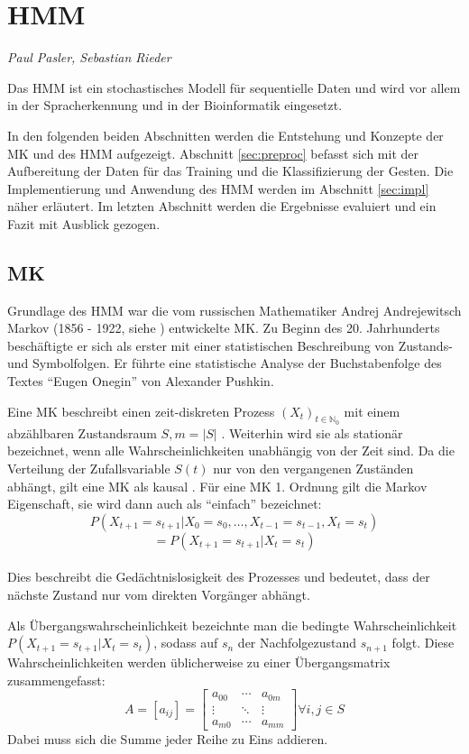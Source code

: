﻿\section{\acl{HMM}}
\label{mainsec:hmm}
\textit{Paul Pasler, Sebastian Rieder}

Das \acl{HMM} ist ein stochastisches Modell für sequentielle Daten und wird vor allem in der Spracherkennung und in der Bioinformatik eingesetzt.

In den folgenden beiden Abschnitten werden die Entstehung und Konzepte der \acl{MK} und des \acl{HMM} aufgezeigt.
Abschnitt \ref{sec:preproc} befasst sich mit der Aufbereitung der Daten für das Training und die Klassifizierung der Gesten.
Die Implementierung und Anwendung des \acl{HMM} werden im Abschnitt \ref{sec:impl} näher erläutert. Im letzten Abschnitt werden die Ergebnisse 
evaluiert und ein Fazit mit Ausblick gezogen.  
 
\subsection{\acl{MK}} \label{sec:chain}
Grundlage des \acl{HMM} war die vom russischen Mathematiker Andrej Andrejewitsch Markov 
(1856 - 1922, siehe \cite{markov1913}) entwickelte \acl{MK}. Zu Beginn des
20. Jahrhunderts beschäftigte er sich als erster mit einer statistischen Beschreibung von Zustands- und Symbolfolgen. 
Er führte eine statistische Analyse der Buchstabenfolge des Textes ``Eugen Onegin'' von Alexander 
Pushkin.

Eine \acl{MK} beschreibt einen zeit-diskreten Prozess \((X_t)_{t\in\mathbb{N}_0}\) mit einem abzählbaren Zustandsraum \(S, m = |S|\) \cite{stochMod}.
Weiterhin wird sie als stationär bezeichnet, wenn alle Wahrscheinlichkeiten unabhängig von der Zeit sind.
Da die Verteilung der Zufallsvariable \( S(t)\) nur von den vergangenen Zuständen abhängt, gilt eine \acl{MK} als kausal \cite[48]{mmmFink}.
Für eine \acl{MK} 1. Ordnung gilt die Markov Eigenschaft, sie wird dann auch als ``einfach'' bezeichnet: 
\[ P (X_{t+1} = s_{t+1} | X_0 = s_0, \ldots , X_{t-1} = s_{t-1}, X_{t} = s_{t}) \]
\[ = P ( X_{t+1} = s_{t+1} | X_{t} = s_{t} ) \] \\
Dies beschreibt die Gedächtnislosigkeit des Prozesses und bedeutet, dass der nächste Zustand nur vom direkten Vorgänger abhängt.

Als Übergangswahrscheinlichkeit bezeichnte man die bedingte Wahrscheinlichkeit \(P ( X_{t+1} = s_{t+1} | X_{t} = s_{t} ) \), sodass auf 
\( s_{n}\) der Nachfolgezustand \( s_{n+1}\) folgt. Diese Wahrscheinlichkeiten werden üblicherweise zu einer Übergangsmatrix zusammengefasst: 
\[ A = [a_{ij}] =
\begin {bmatrix} 
  a_{00}&\cdots&a_{0m} \\
  \vdots&\ddots&\vdots \\
  a_{m0}&\cdots&a_{mm}
 \end {bmatrix} \forall i, j \in S \]
Dabei muss sich die Summe jeder Reihe zu Eins addieren. \\

